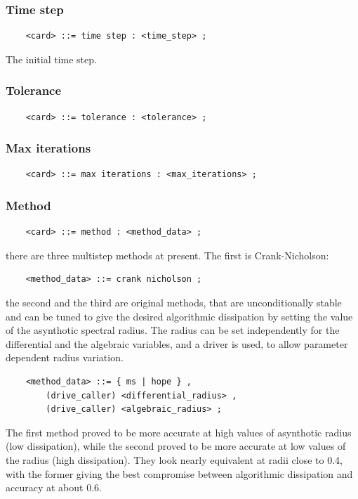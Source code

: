 \documentclass[10pt,dvips]{report}
\begin{document}
\subsubsection{Time step}
\begin{verbatim}
    <card> ::= time step : <time_step> ;
\end{verbatim}
The initial time step.

\subsubsection{Tolerance}
\begin{verbatim}
    <card> ::= tolerance : <tolerance> ;
\end{verbatim}

\subsubsection{Max iterations}
\begin{verbatim}
    <card> ::= max iterations : <max_iterations> ;
\end{verbatim}

\subsubsection{Method}
\begin{verbatim}
    <card> ::= method : <method_data> ;
\end{verbatim}
there are three multistep methods at present. 
The first is Crank-Nicholson:
\begin{verbatim}
    <method_data> ::= crank nicholson ;
\end{verbatim}
the second and the third are original methods, that are unconditionally
stable and can be tuned to give the desired algorithmic dissipation
by setting the value of the asynthotic spectral radius.
The radius can be set independently for the differential
and the algebraic variables, and a driver is used, to allow parameter 
dependent radius variation.
\begin{verbatim}
    <method_data> ::= { ms | hope } ,
        (drive_caller) <differential_radius> ,
        (drive_caller) <algebraic_radius> ;
\end{verbatim}
The first method proved to be more accurate at high values of asynthotic
radius (low dissipation), while the second proved to be more accurate
at low values of the radius (high dissipation).
They look nearly equivalent at radii close to 0.4, with the former
giving the best compromise between algorithmic dissipation and accuracy 
at about 0.6.
\end{document}
